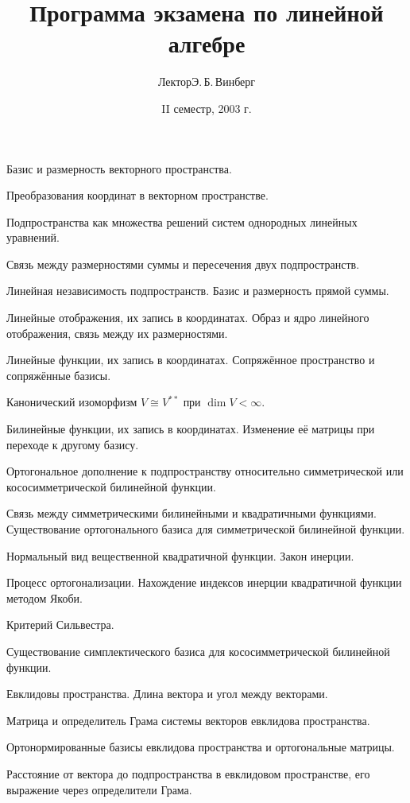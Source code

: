 \documentclass[a4paper]{article}
\title{Программа экзамена по линейной алгебре}
\author{Лектор\т Э.\,Б.\,Винберг}
\date{II семестр, 2003 г.}
\begin{document}
\maketitle
\begin{nums}{-1}
\item Базис и размерность векторного пространства.
\item Преобразования координат в векторном пространстве.
\item Подпространства как множества решений систем однородных линейных уравнений.
\item Связь между размерностями суммы и пересечения двух подпространств.
\item Линейная независимость подпространств. Базис и размерность прямой суммы.
\item Линейные отображения, их запись в координатах. Образ и ядро линейного отображения, связь между их размерностями.
\item Линейные функции, их запись в координатах. Сопряжённое пространство и сопряжённые базисы.
\item Канонический изоморфизм $V \cong V^{**}$ при $\dim V < \infty$.
\item Билинейные функции, их запись в координатах. Изменение её матрицы при переходе к другому базису.
\item Ортогональное дополнение к подпространству относительно симметрической или кососимметрической билинейной функции.
\item Связь между симметрическими билинейными и квадратичными функциями. Существование ортогонального базиса
для симметрической билинейной функции.
\item Нормальный вид вещественной квадратичной функции. Закон инерции.
\item Процесс ортогонализации. Нахождение индексов инерции квадратичной функции методом Якоби.
\item Критерий Сильвестра.
\item Существование симплектического базиса для кососимметрической билинейной функции.
\item Евклидовы пространства. Длина вектора и угол между векторами.
\item Матрица и определитель Грама системы векторов евклидова пространства.
\item Ортонормированные базисы евклидова пространства и ортогональные матрицы.
\item Расстояние от вектора до подпространства в евклидовом пространстве, его выражение через определители Грама.

\end{nums}
\end{document}
